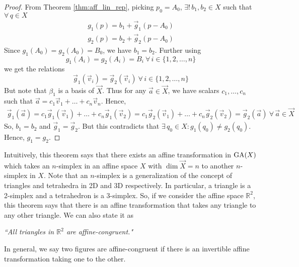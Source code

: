 \begin{proof}
    \noindent
    From Theorem \ref{thm:aff_lin_rep}, picking $p_0=A_0$,
    $\exists!\,b_1,b_2 \in X$ such that $\forall\,q \in X$
    \begin{align*}
        g_1(p) = b_1 + \vec{g}_1(p-A_0) \\
        g_2(p) = b_2 + \vec{g}_2(p-A_0)
    \end{align*}
    Since $g_1(A_0)=g_2(A_0)=B_0$, we have $b_1=b_2$. Further using
    \[ g_1(A_i)=g_2(A_i)=B_i\ \forall\,i\in\{1,2,\dots,n\} \]
    we get the relations
    \[ \vec{g}_1(\vec{v}_i)=\vec{g}_2(\vec{v}_i)\ \forall\,i\in\{1,2,\dots,n\} \]
    But note that $\beta_1$ is a basis of $\vec{X}$. Thus for any
    $\vec{a}\in\vec{X}$, we have scalars $c_1,\dots,c_n$ such that
    $\vec{a}=c_1\vec{v}_1+\dots+c_n\vec{v}_n$. Hence,
    \begin{align*}
        \vec{g}_1(\vec{a}) = c_1\vec{g}_1(\vec{v}_1)+\dots+c_n\vec{g}_1(\vec{v}_2)
        = c_1\vec{g}_2(\vec{v}_1)+\dots+c_n\vec{g}_2(\vec{v}_2)
        = \vec{g}_2(\vec{a})\ \forall\,\vec{a}\in\vec{X}
    \end{align*}
    So, $b_1=b_2$ and $\vec{g}_1=\vec{g}_2$. But this contradicts that
    $\exists\,q_0 \in X: g_1(q_0) \neq g_2(q_0)$. Hence, $g_1=g_2$.
\end{proof}

Intuitively, this theorem says that there exists an affine transformation in
$\operatorname{GA}(X)$ which takes an $n$-simplex in an affine space $X$ with $\dim \vec{X}=n$
to another $n$-simplex in $X$. Note that an $n$-simplex is a generalization of the
concept of triangles and tetrahedra in 2D and 3D respectively. In particular, a
triangle is a 2-simplex and a tetrahedron is a 3-simplex. So, if we consider the
affine space $\mathbb{R}^2$, this theorem says that there is an affine
transformation that takes any triangle to any other triangle. We can also state it
as
\vspace{1ex}

\begin{center}
    \emph{``All triangles in $\mathbb{R}^2$ are affine-congruent."}
\end{center}
\vspace{1ex}

\noindent
In general, we say two figures are affine-congruent if there is an invertible
affine transformation taking one to the other.
